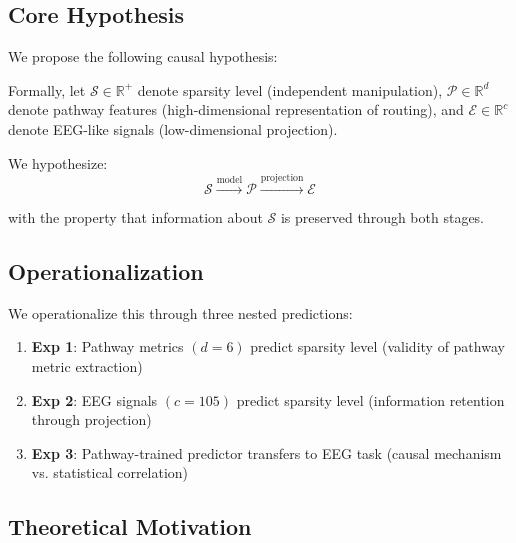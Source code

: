 \subsection{Core Hypothesis}

We propose the following causal hypothesis:

\begin{center}
\end{center}

Formally, let $\mathcal{S} \in \mathbb{R}^+$ denote sparsity level (independent manipulation), $\mathcal{P} \in \mathbb{R}^d$ denote pathway features (high-dimensional representation of routing), and $\mathcal{E} \in \mathbb{R}^c$ denote EEG-like signals (low-dimensional projection).

We hypothesize:
\begin{equation}
\mathcal{S} \xrightarrow{\text{model}} \mathcal{P} \xrightarrow{\text{projection}} \mathcal{E}
\end{equation}

with the property that information about $\mathcal{S}$ is preserved through both stages.

\subsection{Operationalization}

We operationalize this through three nested predictions:

\begin{enumerate}
    \item \textbf{Exp 1}: Pathway metrics $(d=6)$ predict sparsity level (validity of pathway metric extraction)
    \item \textbf{Exp 2}: EEG signals $(c=105)$ predict sparsity level (information retention through projection)
    \item \textbf{Exp 3}: Pathway-trained predictor transfers to EEG task (causal mechanism vs. statistical correlation)
\end{enumerate}

\subsection{Theoretical Motivation}

